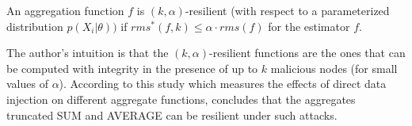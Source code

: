 	\begin{definition}
		\cite{wagner2004resilient} An aggregation function $f$ is $(k, \alpha)$-resilient (with respect to a parameterized distribution $p(X_{i} | \theta))$ if $rms^*(f, k) \le \alpha \cdot rms(f)$ for the estimator $f$.
		\label{def:resilient}
	\end{definition}
	The author's intuition is that the $(k, \alpha)$-resilient functions are the ones that can be computed with integrity in the presence of up to $k$  malicious nodes (for small values of $\alpha$).
	According to this study which measures the effects of direct data injection on different aggregate functions, concludes that the aggregates truncated SUM and AVERAGE can be resilient under such attacks.
